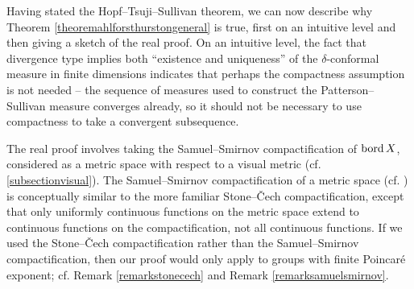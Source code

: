 

Having stated the Hopf--Tsuji--Sullivan theorem, we can now describe why Theorem \ref{theoremahlforsthurstongeneral} is true, first on an intuitive level and then giving a sketch of the real proof. On an intuitive level, the fact that divergence type implies both ``existence and uniqueness'' of the $\delta$-conformal measure in finite dimensions indicates that perhaps the compactness assumption is not needed -- the sequence of measures used to construct the Patterson--Sullivan measure converges already, so it should not be necessary to use compactness to take a convergent subsequence.

The real proof involves taking the Samuel--Smirnov compactification of $\operatorname{bord} X$, considered as a metric space with respect to a visual metric (cf. \6\ref{subsectionvisual}). The Samuel--Smirnov compactification of a metric space (cf. \cite[]{NaimpallyWarrack}) is conceptually similar to the more familiar Stone--\v Cech compactification, except that only uniformly continuous functions on the metric space extend to continuous functions on the compactification, not all continuous functions. If we used the Stone--\v Cech compactification rather than the Samuel--Smirnov compactification, then our proof would only apply to groups with finite Poincar\'e exponent; cf. Remark \ref{remarkstonecech} and Remark \ref{remarksamuelsmirnov}.


